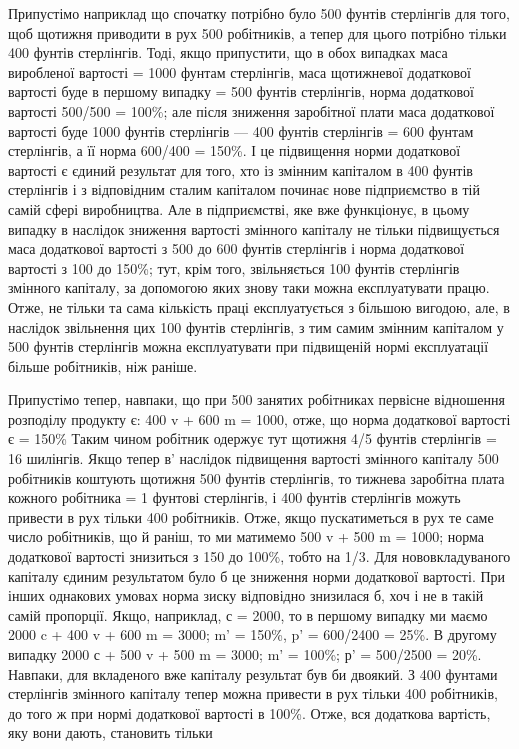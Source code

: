 Припустімо наприклад що спочатку потрібно було 500 фунтів
стерлінгів для того, щоб щотижня приводити в рух 500 робітників, а тепер для цього потрібно тільки
400 фунтів стерлінгів.
Тоді, якщо припустити, що в обох випадках маса виробленої
вартості = 1000 фунтам стерлінгів, маса щотижневої додаткової вартості буде в першому випадку = 500
фунтів стерлінгів, норма додаткової вартості 500/500 = 100\%; але після зниження заробітної плати
маса додаткової вартості буде 1000 фунтів стерлінгів — 400 фунтів стерлінгів = 600 фунтам
стерлінгів, а її норма 600/400 = 150\%. І це підвищення норми додаткової вартості є єдиний результат
для того, хто із змінним капіталом в 400 фунтів стерлінгів і з відповідним сталим капіталом починає
нове підприємство в тій самій сфері виробництва. Але в підприємстві, яке вже функціонує, в цьому
випадку в наслідок зниження вартості змінного
капіталу не тільки підвищується маса додаткової вартості з 500
до 600 фунтів стерлінгів і норма додаткової вартості з 100
до 150\%; тут, крім того, звільняється 100 фунтів стерлінгів
змінного капіталу, за допомогою яких знову таки можна експлуатувати працю. Отже, не тільки та сама
кількість праці експлуатується з більшою вигодою, але, в наслідок звільнення цих 100 фунтів
стерлінгів, з тим самим змінним капіталом у 500 фунтів стерлінгів можна експлуатувати при підвищеній
нормі експлуатації більше робітників, ніж раніше.

Припустімо тепер, навпаки, що при 500 занятих робітниках
первісне відношення розподілу продукту є: 400 v + 600 m = 1000, отже, що норма додаткової вартості є
= 150\% Таким
чином робітник одержує тут щотижня 4/5 фунтів стерлінгів = 16 шилінгів. Якщо тепер в' наслідок
підвищення вартості
змінного капіталу 500 робітників коштують щотижня 500 фунтів
стерлінгів, то тижнева заробітна плата кожного робітника = 1 фунтові стерлінгів, і 400 фунтів
стерлінгів можуть привести
в рух тільки 400 робітників. Отже, якщо пускатиметься в рух те
саме число робітників, що й раніш, то ми матимемо 500 v + 500 m = 1000; норма додаткової вартості
знизиться з 150 до 100\%,
тобто на 1/3. Для нововкладуваного капіталу єдиним результатом було б це зниження норми додаткової
вартості. При інших
однакових умовах норма зиску відповідно знизилася б, хоч і не
в такій самій пропорції. Якщо, наприклад, с = 2000, то в
першому випадку ми маємо 2000 c + 400 v + 600 m = 3000; m' = 150\%, p' = 600/2400 = 25\%. В другому
випадку 2000 с + 500 v + 500 m = 3000; m' = 100\%; р' = 500/2500 = 20\%. Навпаки, для вкладеного вже
капіталу результат був би двоякий. З 400 фунтами
стерлінгів змінного капіталу тепер можна привести в рух тільки
400 робітників, до того ж при нормі додаткової вартості в 100\%.
Отже, вся додаткова вартість, яку вони дають, становить тільки
